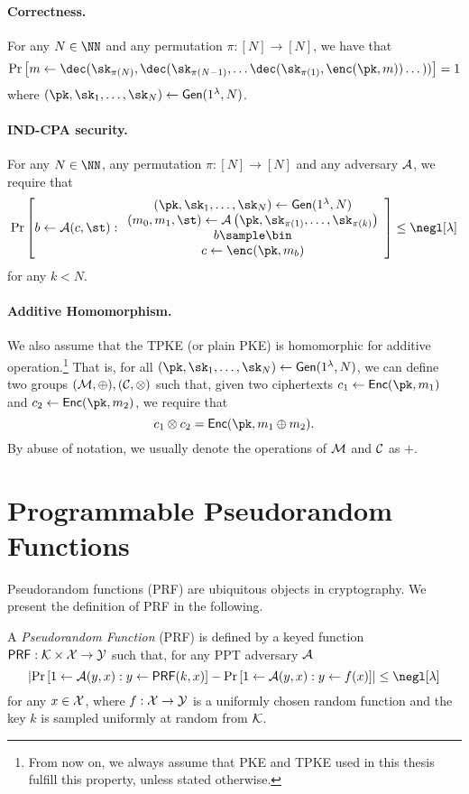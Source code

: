 \paragraph{Correctness.} For any $N\in\NN$ and any permutation $\pi:[N]\to[N]$,  we have that $$\Pr\left[m\leftarrow\dec(\sk_{\pi(N)},\dec(\sk_{\pi(N-1)},\dots \dec(\sk_{\pi(1)},\enc(\pk,m))\dots) )\right]=1$$ where $(\pk,\sk_1,\dots, \sk_N)\leftarrow\mathsf{Gen}(1^\lambda,N)$.

\paragraph{IND-CPA security.} For any $N\in\NN$, any permutation $\pi:[N]\to[N]$ and any adversary $\mathcal{A}$, we require that $$\Pr\left[b\leftarrow\Ac(c,\st):\begin{array}{c}
     (\pk,\sk_1,\dots, \sk_N)\leftarrow\mathsf{Gen}(1^\lambda,N)  \\
     (m_0,m_1,\st)\leftarrow\Ac\left(\pk,\sk_{\pi(1)}, \dots , \sk_{\pi(k)}\right) \\ 
     b\sample \bin \\
     c\leftarrow\enc(\pk,m_b)
\end{array}{}\right]\leq \negl[\lambda]$$ for any $k<N$.

\paragraph{Additive Homomorphism.} We also assume that the TPKE (or plain PKE) is homomorphic for additive operation.\footnote{From now on, we always assume that PKE and TPKE used in this thesis fulfill this property, unless stated otherwise.} That is, for all $(\pk,\sk_1,\dots,\sk_N)\leftarrow\mathsf{Gen}(1^\lambda,N)$, we can define two groups $(\mathcal{M},\oplus),(\mathcal{C},\otimes)$ such that, given two ciphertexts $c_1\leftarrow\mathsf{Enc}(\pk,m_1)$ and $c_2\leftarrow\mathsf{Enc}(\pk,m_2)$, we require that $$c_1\otimes c_2=\mathsf{Enc}(\pk,m_1\oplus m_2).$$ By abuse of notation, we usually denote the operations of $\mathcal{M}$ and $\mathcal{C}$ as $+$.

\section{Programmable Pseudorandom Functions}
\label{subsec:pprf}
Pseudorandom functions (PRF) are ubiquitous objects in cryptography. We present the definition of PRF in the following.

\begin{definition}
A \emph{Pseudorandom Function} (PRF) is defined by a keyed function $\mathsf{PRF}:\mathcal{K}\times \mathcal{X}\to \mathcal{Y}$ such that, for any PPT adversary $\mathcal{A}$ $$\left|\Pr\left[1\leftarrow\Ac(y,x):y\leftarrow\mathsf{PRF}(k,x)\right]-\Pr\left[1\leftarrow\Ac(y,x):y\leftarrow f(x)\right]\right|\leq \negl[\lambda]$$ for any $x\in\mathcal{X}$, where $f:\mathcal{X}\to\mathcal{Y}$ is a uniformly chosen random function and the key $k$ is sampled uniformly at random from $\mathcal{K}$. 
\end{definition}{}

